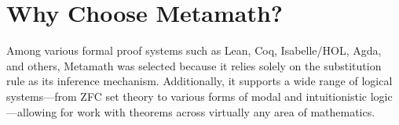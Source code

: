 \section{Why Choose Metamath?}
\hspace{\parindent}
Among various formal proof systems such as Lean, Coq, Isabelle/HOL, Agda, and others, Metamath was selected because it relies solely on the substitution rule as its inference mechanism. Additionally, it supports a wide range of logical systems—from ZFC set theory to various forms of modal and intuitionistic logic—allowing for work with theorems across virtually any area of mathematics.  
